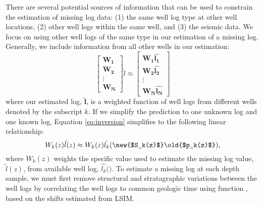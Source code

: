There are several potential sources of information that can be used to constrain the estimation of missing log data: (1) the same well log type at other well locations, (2) other well logs within the same well, and (3) the seismic data. We focus on using other well logs of the same type in our estimation of a missing log.  Generally, we include information from all other wells in our estimation:
\begin{equation} \label{eq:inversion}
\begin{bmatrix} \boldsymbol{W_1} \\ \boldsymbol{W_2} \\ \vdots \\ \boldsymbol{W_N} \end{bmatrix} \tilde{l} \approx \begin{bmatrix} \boldsymbol{W_1}\boldsymbol{\hat{l_1}} \\ \boldsymbol{W_2}\boldsymbol{\hat{l_2}} \\ \vdots \\ \boldsymbol{W_N}\boldsymbol{\hat{l_N}} \end{bmatrix}
\end{equation}
where our estimated log, $\boldsymbol{\tilde{l}}$, is a weighted function of well logs from different wells denoted by the subscript $k$. If we simplify the prediction to one unknown log and one known log, Equation \ref{eq:inversion} simplifies to the following linear relationship:
\begin{equation} \label{eq:linear}
W_k(z) \tilde{l}(z) \approx W_k(z) \hat{l_k}(\text{\new{$S_k(z)$}\old{$p_k(z)$}}),
\end{equation}
where $W_k(z)$ weights the specific value used to estimate the missing log value, $\tilde{l}(z)$, from  available well log, $\hat{l_k}($$)$. To estimate a missing log at each depth sample, we must first remove structural and stratagraphic variations between the well logs by correlating the well logs to common geologic time using function\old{,} , based on the shifts estimated from LSIM. 

